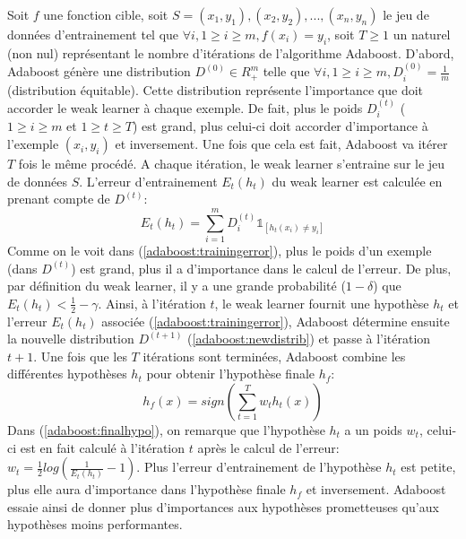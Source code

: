 \documentclass[12pt]{article}
\begin{document}
	Soit $f$ une fonction cible, soit $S=(x_1,y_1),(x_2,y_2),...,(x_n,y_n)$ le jeu de données d'entrainement tel que $\forall i, 1 \geq i \geq m, f(x_i) = y_i$, soit $T \geq 1$ un naturel (non nul) représentant le nombre d'itérations de l'algorithme Adaboost. D'abord, Adaboost génère une distribution $D^{(0)} \in R^m_+$ telle que $\forall i, 1 \geq i \geq m, D^{(0)}_i = \frac{1}{m}$ (distribution équitable). Cette distribution représente l'importance que doit accorder le weak learner à chaque exemple. De fait, plus le poids $D^{(t)}_i$ ($1 \geq i \geq m$ et $1 \geq t \geq T$) est grand, plus celui-ci doit accorder d'importance à l'exemple $(x_i,y_i)$ et inversement. Une fois que cela est fait, Adaboost va itérer $T$ fois le même procédé. A chaque itération, le weak learner s'entraine sur le jeu de données $S$. L'erreur d'entrainement $E_t(h_t)$ du weak learner est calculée en prenant compte de $D^{(t)}$:
	\begin{equation}
		\label{adaboost:trainingerror}
		E_t(h_t) = \sum_{i=1}^m D^{(t)}_i \mathbb{1}_{[h_t(x_i) \neq y_i]}
	\end{equation}
	Comme on le voit dans (\ref{adaboost:trainingerror}), plus le poids d'un exemple (dans $D^{(t)}$) est grand, plus il a d'importance dans le calcul de l'erreur. De plus, par définition du weak learner, il y a une grande probabilité ($1- \delta$) que $E_t(h_t)< \frac{1}{2} - \gamma$. Ainsi, à l'itération $t$, le weak learner fournit une hypothèse $h_t$ et l'erreur $E_t(h_t)$ associée (\ref{adaboost:trainingerror}), Adaboost détermine ensuite la nouvelle distribution $D^{(t+1)}$ (\ref{adaboost:newdistrib}) et passe à l'itération $t+1$. Une fois que les $T$ itérations sont terminées, Adaboost combine les différentes hypothèses $h_t$ pour obtenir l'hypothèse finale $h_f$:
	\begin{equation}
		\label{adaboost:finalhypo}
		h_f(x) = sign (\sum_{t=1}^T w_t h_t(x))
	\end{equation}
	Dans (\ref{adaboost:finalhypo}), on remarque que l'hypothèse $h_t$ a un poids $w_t$, celui-ci est en fait calculé à l'itération $t$ après le calcul de l'erreur: $w_t = \frac{1}{2} log(\frac{1}{E_t(h_t)} - 1)$. Plus l'erreur d'entrainement de l'hypothèse $h_t$ est petite, plus elle aura d'importance dans l'hypothèse finale $h_f$ et inversement. Adaboost essaie ainsi de donner plus d'importances aux hypothèses prometteuses qu'aux hypothèses moins performantes.
	
	
\end{document}
